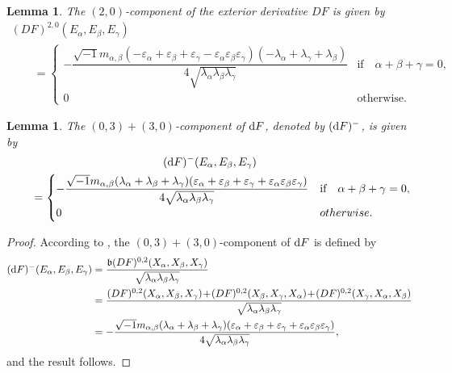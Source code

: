 \documentclass[10pt,a4paper]{amsart}
\numberwithin{equation}{section}
\newtheorem{Lemma}[Theorem]{Lemma}
\begin{document}
\begin{Lemma}
The $(2,0)$-component of the exterior derivative $DF$ is given by
\begin{gather*}
(DF)^{2,0}(E_{\alpha},E_{\beta},E_{\gamma})
\\ \qquad
{}=
\begin{cases}
-\dfrac{\sqrt{-1} m_{\alpha,\beta}(-\varepsilon_{\alpha}+\varepsilon_{\beta}+\varepsilon_{\gamma} -\varepsilon_{\alpha}\varepsilon_{\beta}\varepsilon_{\gamma})(-\lambda_{\alpha}+\lambda_{\gamma} +\lambda_{\beta})}{4\sqrt{\lambda_{\alpha}\lambda_{\beta}\lambda_{\gamma}}} & \text{if}\quad \alpha+\beta+\gamma = 0,
\\
0& \text{otherwise.}
\end{cases}
\end{gather*}
\end{Lemma}


\begin{Lemma}
The $(0,3)+(3,0)$-component of ${\rm d}F$, denoted by $({\rm d}F)^{-}$, is given by
\begin{gather*}({\rm d}F)^{-}(E_{\alpha},E_{\beta},E_{\gamma})
\\ \qquad
{}=
\begin{cases}
-\dfrac{\sqrt{-1} m_{\alpha,\beta}(\lambda_{\alpha}+\lambda_{\beta}+\lambda_{\gamma})(\varepsilon_{\alpha} +\varepsilon_{\beta}+\varepsilon_{\gamma}+\varepsilon_{\alpha}\varepsilon_{\beta}\varepsilon_{\gamma})} {4\sqrt{\lambda_{\alpha}\lambda_{\beta}\lambda_{\gamma}}} &\text{if}\quad \alpha+\beta+\gamma = 0,
\\
0 & {otherwise.}
\end{cases}
\end{gather*}
\end{Lemma}
\begin{proof}
According to \cite{gau}, the $(0,3)+(3,0)$-component of ${\rm d}F$ is defined by
\begin{align*}
({\rm d}F)^{-}(E_{\alpha},E_{\beta},E_{\gamma})&= \dfrac{\mathfrak{b}(DF)^{0,2}(X_{\alpha},X_{\beta},X_{\gamma})} {\sqrt{\lambda_{\alpha}\lambda_{\beta}\lambda_{\gamma}}}
\\
&=\dfrac{(DF)^{0,2}(X_{\alpha},X_{\beta},X_{\gamma})\!+\!(DF)^{0,2}(X_{\beta},X_{\gamma},X_{\alpha}) \!+\!(DF)^{0,2}(X_{\gamma},X_{\alpha},X_{\beta})}{\sqrt{\lambda_{\alpha}\lambda_{\beta}\lambda_{\gamma}}}
\\
&=-\dfrac{ \sqrt{-1} m_{\alpha,\beta}(\lambda_{\alpha}+\lambda_{\beta}+\lambda_{\gamma})(\varepsilon_{\alpha} +\varepsilon_{\beta}+\varepsilon_{\gamma}+\varepsilon_{\alpha}\varepsilon_{\beta}\varepsilon_{\gamma})} {4\sqrt{\lambda_{\alpha}\lambda_{\beta}\lambda_{\gamma}}},
\end{align*}
and the result follows.
\end{proof}
\end{document}
